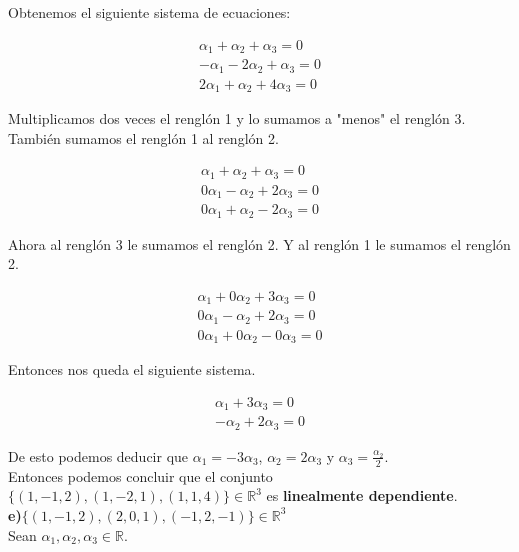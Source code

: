 \documentclass[letterpaper]{article}
\renewcommand{\*}{\cdot}
\theoremstyle{definition}
\begin{document}
Obtenemos el siguiente sistema de ecuaciones:
\begin{center}
	\begin{align*}
	\alpha_{1}+\alpha_{2}+\alpha_{3}=0\\
	-\alpha_{1}-2\alpha_{2}+\alpha_{3}=0\\
	2\alpha_{1}+\alpha_{2}+4\alpha_{3}=0
	\end{align*}
\end{center}

Multiplicamos dos veces el renglón 1 y lo sumamos a "menos" el renglón 3. También sumamos el renglón 1 al renglón 2.
\begin{center}
	\begin{align*}
	\alpha_{1}+\alpha_{2}+\alpha_{3}=0\\
	0\alpha_{1}-\alpha_{2}+2\alpha_{3}=0\\
	0\alpha_{1}+\alpha_{2}-2\alpha_{3}=0
	\end{align*}
\end{center}

Ahora al renglón 3 le sumamos el renglón 2. Y al renglón 1 le sumamos el renglón 2.
\begin{center}
	\begin{align*}
	\alpha_{1}+0\alpha_{2}+3\alpha_{3}=0\\
	0\alpha_{1}-\alpha_{2}+2\alpha_{3}=0\\
	0\alpha_{1}+0\alpha_{2}-0\alpha_{3}=0
	\end{align*}
\end{center}

Entonces nos queda el siguiente sistema.
\begin{center}
	\begin{align*}
	\alpha_{1}+3\alpha_{3}=0\\
	-\alpha_{2}+2\alpha_{3}=0
	\end{align*}
\end{center}

De esto podemos deducir que $\alpha_{1}=-3\alpha_{3}$, $\alpha_{2}= 2\alpha_{3}$ y $\alpha_{3}= \frac{\alpha_{2}}{2}$.\\

Entonces podemos concluir que el conjunto $\lbrace (1,-1,2), (1,-2,1), (1,1,4) \rbrace \in \mathbb{R}^{3}$ es \textbf{linealmente dependiente}.\\

\textbf{e)}$\lbrace (1,-1,2), (2,0,1),(-1,2,-1)\rbrace \in \mathbb{R}^{3}$\\

Sean $\alpha_{1}, \alpha_{2}, \alpha_{3}\in \mathbb{R}$.
\end{document}
